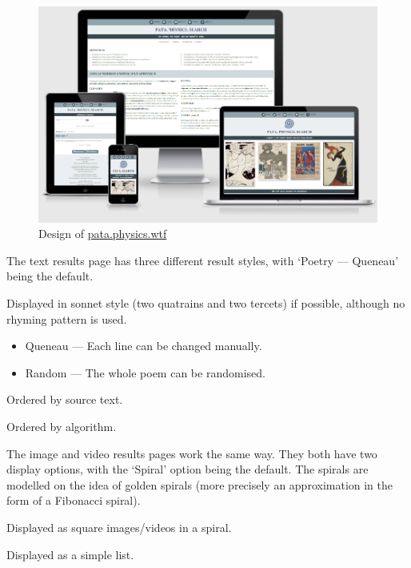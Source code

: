\begin{figure}[!htbp] %
  \centering
  \includegraphics[width=\linewidth]{images/proto3screen}
\caption[Design of \url{pata.physics.wtf}]{Design of \url{pata.physics.wtf}}
\label{img:proto3screen}
\end{figure}

The text results page has three different result styles, with `Poetry --- Queneau' being the default.

\begin{description}[leftmargin=2.8cm]
  \item [Poetry] Displayed in sonnet style (two quatrains and two tercets) if possible, although no rhyming pattern is used.
    \begin{itemize}
      \item Queneau --- Each line can be changed manually.
      \item Random --- The whole poem can be randomised.
    \end{itemize}
  \item [Sources] Ordered by source text.
  \item [Algorithms] Ordered by algorithm.
\end{description}

The image and video results pages work the same way. They both have two display options, with the `Spiral' option being the default. The spirals are modelled on the idea of golden spirals (more precisely an approximation in the form of a Fibonacci spiral).

\begin{description}[leftmargin=1.8cm]
  \item [Spiral] Displayed as square images/videos in a spiral.
  \item [List] Displayed as a simple list.
\end{description}

